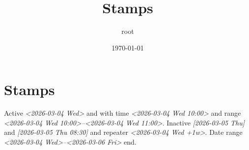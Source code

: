 \documentclass[11pt]{article}
\author{root}
\date{\today}
\title{Stamps}
\begin{document}
\maketitle
\tableofcontents

\section{Stamps}
\label{sec:orgcc48894}
Active \textit{<2026-03-04 Wed> } and with time \textit{<2026-03-04 Wed 10:00> } and range \textit{<2026-03-04 Wed 10:00>--<2026-03-04 Wed 11:00>}.
Inactive \textit{[2026-03-05 Thu] } and \textit{[2026-03-05 Thu 08:30] } and repeater \textit{<2026-03-04 Wed +1w>}.
Date range \textit{<2026-03-04 Wed>--<2026-03-06 Fri> } end.
\end{document}
